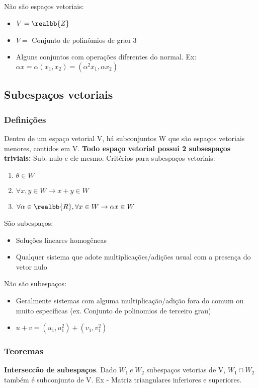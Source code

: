 \documentclass[letterpaper, 11pt]{article}
\begin{document}
Não são espaços vetoriais:
\begin{itemize}
\item \(V = \realbb{Z}\)
\item \(V =\) Conjunto de polinômios de grau 3
\item Alguns conjuntos com operações diferentes do normal. Ex: \(\alpha x = \alpha (x_1, x_2) = (\alpha ^2 x_1, \alpha x_2)\)
\end{itemize}

\subsection{Subespaços vetoriais}
\label{sec:org0432817}
\subsubsection{Definições}
\label{sec:org12d2fe6}
Dentro de um espaço vetorial V, há subconjuntos W que são espaços vetoriais menores, contidos em V. \textbf{Todo espaço vetorial possui 2 subsespaços triviais:} Sub. nulo e ele mesmo.
Critérios para subespaços vetoriais:
\begin{enumerate}
\item \(\theta \in W\)
\item \(\forall x, y \in W \rightarrow x + y \in W\)
\item \(\forall \alpha \in \realbb{R}, \forall x \in W \rightarrow \alpha x \in W\)
\end{enumerate}
São subespaços:
\begin{itemize}
\item Soluções lineares homogêneas
\item Qualquer sistema que adote multiplicações/adições usual com a presença do vetor nulo
\end{itemize}
Não são subespaços:
\begin{itemize}
\item Geralmente sistemas com alguma multiplicação/adição fora do comum ou muito específicas (ex. Conjunto de polinomios de terceiro grau)
\item \(u + v = (u_1 , u_1^2) + (v_1, v_1^2)\)
\end{itemize}
\subsubsection{Teoremas}
\label{sec:orgba17d65}
\textbf{Interseccão de subespaços}. Dado \(W_1 \  e \  W_2\) subespaços vetorias de V, \(W_1 \cap W_2\) também é subconjunto de V. Ex - Matriz triangulares inferiores e superiores.
\end{document}
